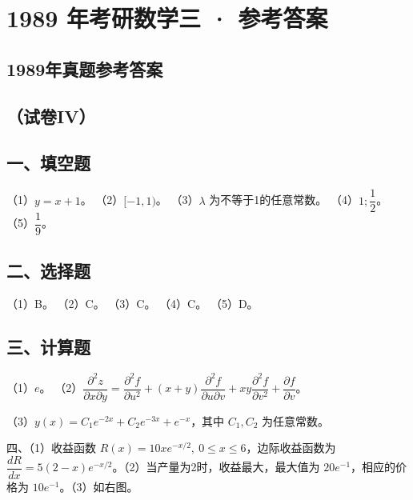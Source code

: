 \documentclass[UTF8,12pt]{ctexart}
\begin{document}
\section*{1989 年考研数学三 · 参考答案}
\subsection*{1989年真题参考答案}

\subsection*{（试卷IV）}

\subsection*{一、填空题}

（1）\(\displaystyle y=x+1\)。 （2）\(\displaystyle [-1,\allowbreak 1)\)。 （3）\(\displaystyle \lambda\) 为不等于1的任意常数。 （4）\(\displaystyle 1;\dfrac{\displaystyle 1}{\displaystyle 2}\)。 （5）\(\displaystyle \dfrac{\displaystyle 1}{\displaystyle 9}\)。


\subsection*{二、选择题}

（1）B。 （2）C。 （3）C。 （4）C。 （5）D。


\subsection*{三、计算题}

（1）\(\displaystyle e\)。 （2）\(\displaystyle \dfrac{\displaystyle \partial^2z}{\displaystyle \partial x\partial y}=\dfrac{\displaystyle \partial^2f}{\displaystyle \partial u^2}+(x+y)\dfrac{\displaystyle \partial^2f}{\displaystyle \partial u\partial v}+xy\dfrac{\displaystyle \partial^2f}{\displaystyle \partial v^2}+\dfrac{\displaystyle \partial f}{\displaystyle \partial v}\)。


（3）\(\displaystyle y(x)=C_1e^{-2x}+C_2e^{-3x}+e^{-x}\)，其中 \(\displaystyle C_1,\allowbreak C_2\) 为任意常数。


四、（1）收益函数 \(\displaystyle R(x)=10xe^{-x/2},\allowbreak \ 0\le x\le6\)，边际收益函数为 \(\displaystyle \dfrac{\displaystyle dR}{\displaystyle dx}=5(2-x)e^{-x/2}\)。（2）当产量为2时，收益最大，最大值为 \(\displaystyle 20e^{-1}\)，相应的价格为 \(\displaystyle 10e^{-1}\)。（3）如右图。
\end{document}
